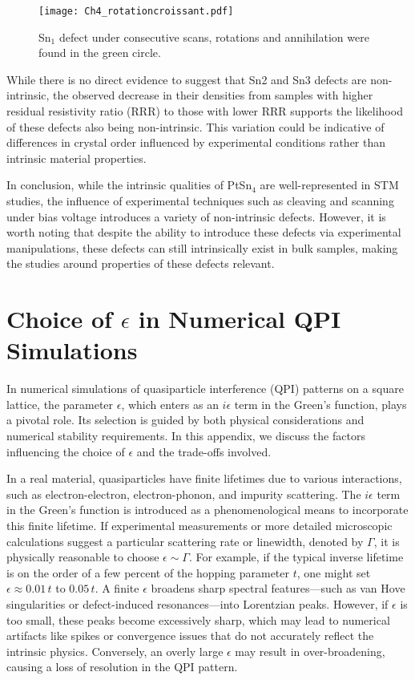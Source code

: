 \begin{figure}
	\centering
	\texttt{[image: Ch4\_rotationcroissant.pdf]}
	\caption{Sn$_1$ defect under consecutive scans, rotations and annihilation were found in the green circle.}
	\label{fig:Ch4_rotationcroissant}
\end{figure}
\par While there is no direct evidence to suggest that Sn2 and Sn3 defects are non-intrinsic, the observed decrease in their densities from samples with higher residual resistivity ratio (RRR) to those with lower RRR supports the likelihood of these defects also being non-intrinsic. This variation could be indicative of differences in crystal order influenced by experimental conditions rather than intrinsic material properties.

\par In conclusion, while the intrinsic qualities of PtSn$_4$ are well-represented in STM studies, the influence of experimental techniques such as cleaving and scanning under bias voltage introduces a variety of non-intrinsic defects. However, it is worth noting that despite the ability to introduce these defects via experimental manipulations, these defects can still intrinsically exist in bulk samples, making the studies around properties of these defects relevant. 


\chapter{Choice of $\epsilon$ in Numerical QPI Simulations} \label{app:epsilon}

In numerical simulations of quasiparticle interference (QPI) patterns on a square lattice, the parameter $\epsilon$, which enters as an $i\epsilon$ term in the Green's function, plays a pivotal role. Its selection is guided by both physical considerations and numerical stability requirements. In this appendix, we discuss the factors influencing the choice of $\epsilon$ and the trade-offs involved.

In a real material, quasiparticles have finite lifetimes due to various interactions, such as electron-electron, electron-phonon, and impurity scattering. The $i\epsilon$ term in the Green’s function is introduced as a phenomenological means to incorporate this finite lifetime. If experimental measurements or more detailed microscopic calculations suggest a particular scattering rate or linewidth, denoted by $\Gamma$, it is physically reasonable to choose $\epsilon \sim \Gamma$. For example, if the typical inverse lifetime is on the order of a few percent of the hopping parameter $t$, one might set $\epsilon \approx 0.01\,t$ to $0.05\,t$. A finite $\epsilon$ broadens sharp spectral features—such as van Hove singularities or defect-induced resonances—into Lorentzian peaks. However, if $\epsilon$ is too small, these peaks become excessively sharp, which may lead to numerical artifacts like spikes or convergence issues that do not accurately reflect the intrinsic physics. Conversely, an overly large $\epsilon$ may result in over-broadening, causing a loss of resolution in the QPI pattern.

